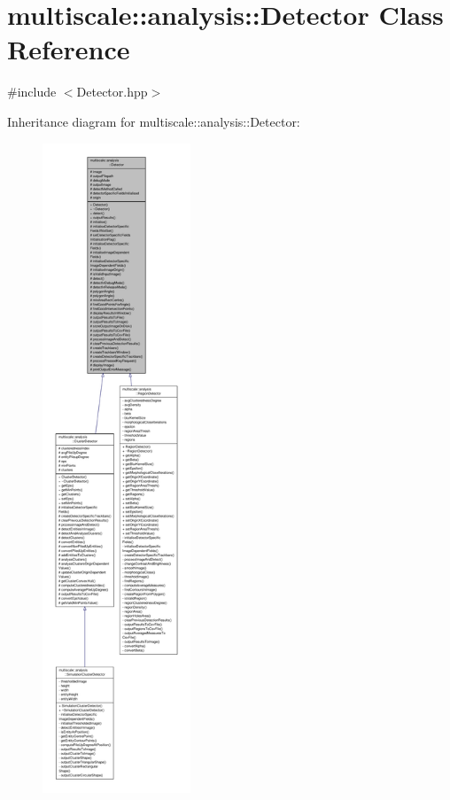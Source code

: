 \hypertarget{classmultiscale_1_1analysis_1_1Detector}{\section{multiscale\-:\-:analysis\-:\-:Detector Class Reference}
\label{classmultiscale_1_1analysis_1_1Detector}
}


{\ttfamily \#include $<$Detector.\-hpp$>$}



Inheritance diagram for multiscale\-:\-:analysis\-:\-:Detector\-:\nopagebreak
\begin{figure}[H]
\begin{center}
\leavevmode
\includegraphics[height=550pt]{classmultiscale_1_1analysis_1_1Detector__inherit__graph}
\end{center}
\end{figure}


